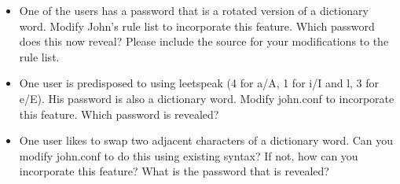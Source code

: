 \documentclass[11pt]{article}
\begin{document}
\begin{enumerate}
\begin{itemize}
\item One of the users has a password that is a rotated version of a
  dictionary word. Modify John’s rule list to incorporate this
  feature. Which password does this now reveal? Please include the
  source for your modifications to the rule list.

\item One user is predisposed to using leetspeak (4 for a/A, 1 for i/I
  and l, 3 for e/E). His password is also a dictionary word. Modify
  john.conf to incorporate this feature. Which password is revealed?

\item One user likes to swap two adjacent characters of a dictionary
  word. Can you modify john.conf to do this using existing syntax? If
  not, how can you incorporate this feature? What is the password that
  is revealed?

\end{itemize}

\end{enumerate}
\end{document}
